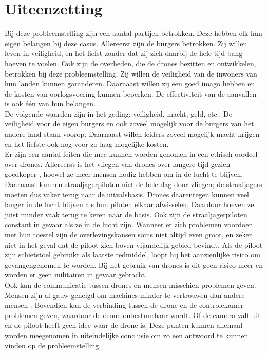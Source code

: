 \section{Uiteenzetting}\subtitle{Timothy de Moor}
Bij deze probleemstelling zijn een aantal partijen betrokken. Deze hebben elk hun eigen belangen bij deze casus. Allereerst zijn de burgers betrokken. Zij willen leven in veiligheid, en het liefst zonder dat zij zich daarbij de hele tijd bang hoeven te voelen. Ook zijn de overheden, die de drones bezitten en ontwikkelen, betrokken bij deze probleemstelling. Zij willen de veiligheid van de inwoners van hun landen kunnen garanderen. Daarnaast willen zij een goed imago hebben en de kosten van oorlogsvoering kunnen beperken. De effectiviteit van de aanvallen is ook \'e\'en van hun belangen.\\

De volgende waarden zijn in het geding: veiligheid, macht, geld, etc.. De veiligheid voor de eigen burgers en ook zoveel mogelijk voor de burgers van het andere land staan voorop. Daarnaast willen 
leiders zoveel mogelijk macht krijgen en het liefste ook nog voor zo laag mogelijke kosten.\\

Er zijn een aantal feiten die mee kunnen worden genomen in een ethisch oordeel over drones. Allereerst is het vliegen van drones over langere tijd gezien goedkoper \cite{pdf_ethiek_drone_aanvallen}, hoewel ze meer mensen nodig hebben om in de lucht te blijven. Daarnaast kunnen straaljagerpiloten niet de hele dag door vliegen; de straaljagers moeten dus vaker terug naar de uitvalsbasis. Drones daarentegen kunnen veel langer in de lucht blijven als hun piloten elkaar afwisselen\cite{briefing}. Daardoor hoeven ze juist minder vaak terug te keren naar de basis. Ook zijn de straaljagerpiloten constant in gevaar als ze in de lucht zijn. Wanneer er zich problemen voordoen met hun toestel zijn de overlevingskansen soms niet altijd even groot, en zeker niet in het geval dat de piloot zich boven vijandelijk gebied bevindt. Als de piloot zijn schietstoel gebruikt als laatste redmiddel, loopt hij het aanzienlijke risico om gevangengenomen te worden. Bij het gebruik van drones is dit geen risico meer en worden er geen militairen in gevaar gebracht.\\

Ook kan de communicatie tussen drones en mensen misschien problemen geven. Mensen zijn al gauw geneigd om machines minder te vertrouwen dan andere mensen \cite{briefing}. Bovendien kan de verbinding tussen de drone en de controlekamer problemen geven, waardoor de drone onbestuurbaar wordt. Of de camera valt uit en de piloot heeft geen idee waar de drone is. Deze punten kunnen allemaal worden meegenomen in uiteindelijke conclusie om zo een antwoord te kunnen vinden op de probleemstelling.
